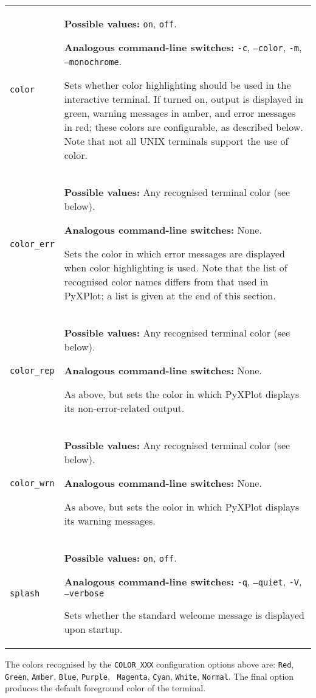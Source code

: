 \begin{longtable}{p{3.4cm}p{9cm}}
{\tt color} & {\bf Possible values:} {\tt on}, {\tt off}.

               {\bf Analogous command-line switches:} {\tt -c}, {\tt --color}, {\tt -m}, {\tt --monochrome}.

               Sets whether color highlighting should be used in the interactive terminal. If turned on, output is displayed in green, warning messages in amber, and error messages in red; these colors are configurable, as described below. Note that not all UNIX terminals support the use of color.
               \\
{\tt color\_err} & {\bf Possible values:} Any recognised terminal color (see below).

               {\bf Analogous command-line switches:} None.

               Sets the color in which error messages are displayed when color highlighting is used. Note that the list of recognised color names differs from that used in PyXPlot; a list is given at the end of this section.
               \\
{\tt color\_rep} & {\bf Possible values:} Any recognised terminal color (see below).

               {\bf Analogous command-line switches:} None.

               As above, but sets the color in which PyXPlot displays its non-error-related output.
               \\
{\tt color\_wrn} & {\bf Possible values:} Any recognised terminal color (see below).

               {\bf Analogous command-line switches:} None.

               As above, but sets the color in which PyXPlot displays its warning messages.
               \\
{\tt splash} & {\bf Possible values:} {\tt on}, {\tt off}.

               {\bf Analogous command-line switches:} {\tt -q}, {\tt --quiet}, {\tt -V}, {\tt --verbose}

               Sets whether the standard welcome message is displayed upon startup.
               \\
\end{longtable}

The colors recognised by the {\tt COLOR\_XXX} configuration options above
are: {\tt Red}, {\tt Green}, {\tt Amber}, {\tt Blue}, {\tt Purple}, {\tt
Magenta}, {\tt Cyan}, {\tt White}, {\tt Normal}. The final option produces the
default foreground color of the terminal.

